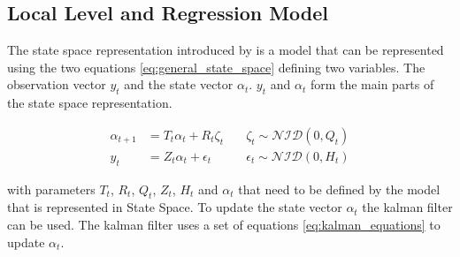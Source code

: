 \subsection{Local Level and Regression Model}
\label{subsec:state space}
The state space representation introduced by \cite{Kalman1960AProblems} is a model that can be represented using the two equations \eqref{eq:general_state_space} defining two variables. The observation vector $y_t$ and the state vector $\alpha_t$.  $y_t$ and $\alpha_t$ form the main parts of the state space representation.

\begin{equation}
\label{eq:general_state_space}
\begin{aligned}
\alpha_{t+1} &= T_t\alpha_t + R_t\zeta_t \quad &\zeta_t \sim \mathcal{NID}(0, Q_t)\\
    y_t &= Z_t\alpha_t + \epsilon_t \quad &\epsilon_t \sim \mathcal{NID}(0, H_t)
\end{aligned}
\end{equation}

with parameters $T_t$, $R_t$, $Q_t$, $Z_t$, $H_t$ and $\alpha_t$ that need to be defined by the model that is represented in State Space. To update the state vector $\alpha_t$ the kalman filter \citep{Kalman1960AProblems} can be used. The kalman filter uses a set of equations \eqref{eq:kalman_equations} to update $\alpha_t$.

